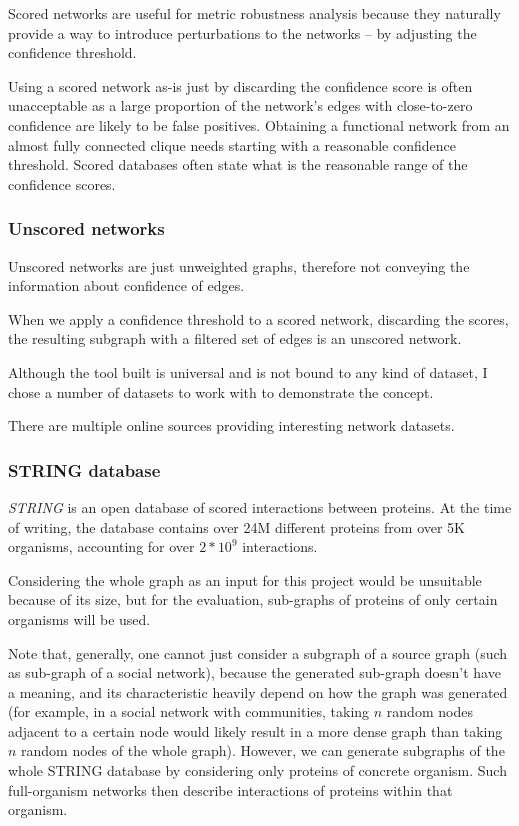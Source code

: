 Scored networks are useful for metric robustness analysis because they naturally provide a way to introduce perturbations to the networks -- by adjusting the confidence threshold.

Using a scored network as-is just by discarding the confidence score is often unacceptable as a large proportion of the network's edges with close-to-zero confidence are likely to be false positives.
Obtaining a functional network from an almost fully connected clique needs starting with a reasonable confidence threshold.
Scored databases often state what is the reasonable range of the confidence scores.

\subsubsection{Unscored networks}

Unscored networks are just unweighted graphs, therefore not conveying the information about confidence of edges.

When we apply a confidence threshold to a scored network, discarding the scores, the resulting subgraph with a filtered set of edges is an unscored network.

\parspace

Although the \graffs tool built is universal and is not bound to any kind of dataset, I chose a number of datasets to work with to demonstrate the concept.

There are multiple online sources providing interesting network datasets.

\subsubsection{STRING database}\label{sec:string_database}

\textit{STRING}\cite{Szklarczyk2019} is an open database of scored interactions between proteins.
At the time of writing, the database contains over 24M different proteins from over 5K organisms, accounting for over $2 * 10^9$ interactions.

Considering the whole graph as an input for this project would be unsuitable because of its size, but for the evaluation, sub-graphs of proteins of only certain organisms will be used.

Note that, generally, one cannot just consider a subgraph of a source graph (such as sub-graph of a social network), because the generated sub-graph doesn't have a meaning, and its characteristic heavily depend on how the graph was generated (for example, in a social network with communities, taking $n$ random nodes adjacent to a certain node would likely result in a more dense graph than taking $n$ random nodes of the whole graph).
However, we can generate subgraphs of the whole STRING database by considering only proteins of concrete organism.
Such full-organism networks then describe interactions of proteins within that organism.

